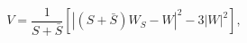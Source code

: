 \begin{equation}
V = \frac{1}{S + \bar S}\left[|(S+\bar S)W_S-W|^2-3|W|^2\right],
\label{scalar-V}
\end{equation}


